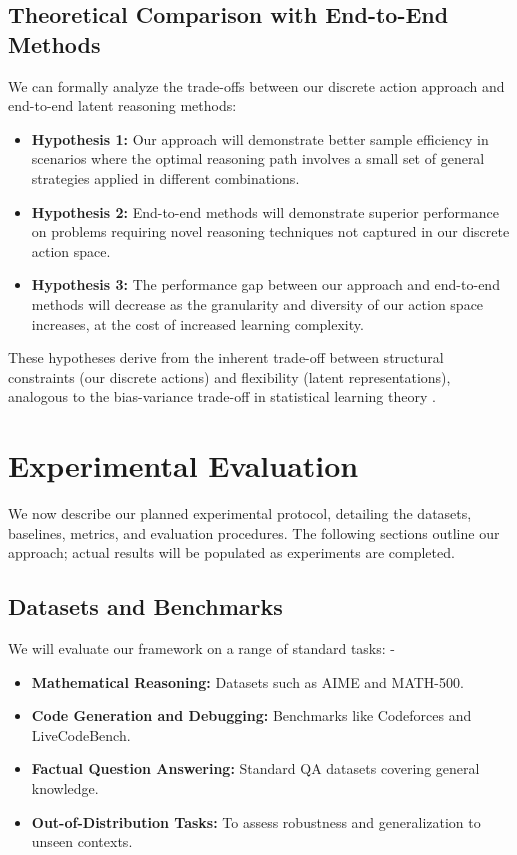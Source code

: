 \documentclass[10pt,journal,compsoc]{IEEEtran}
\begin{document}
\subsection{Theoretical Comparison with End-to-End Methods}

We can formally analyze the trade-offs between our discrete action approach and end-to-end latent reasoning methods:

\begin{itemize}
\item \textbf{Hypothesis 1:} Our approach will demonstrate better sample efficiency in scenarios where the optimal reasoning path involves a small set of general strategies applied in different combinations.

\item \textbf{Hypothesis 2:} End-to-end methods will demonstrate superior performance on problems requiring novel reasoning techniques not captured in our discrete action space.

\item \textbf{Hypothesis 3:} The performance gap between our approach and end-to-end methods will decrease as the granularity and diversity of our action space increases, at the cost of increased learning complexity.
\end{itemize}

These hypotheses derive from the inherent trade-off between structural constraints (our discrete actions) and flexibility (latent representations), analogous to the bias-variance trade-off in statistical learning theory \citep{geman1992neural}.

\section{Experimental Evaluation}

We now describe our planned experimental protocol, detailing the
datasets, baselines, metrics, and evaluation procedures. The following
sections outline our approach; actual results will be populated as
experiments are completed.


\subsection{Datasets and Benchmarks}

We will evaluate our framework on a range of standard tasks: -
\begin{itemize}
\item \textbf{Mathematical Reasoning:} Datasets such as AIME and MATH-500.
\item \textbf{Code Generation and Debugging:} Benchmarks like Codeforces and LiveCodeBench.
\item \textbf{Factual Question Answering:} Standard QA datasets covering general knowledge.
\item \textbf{Out-of-Distribution Tasks:} To assess robustness and generalization to unseen contexts.
\end{itemize}
\end{document}
